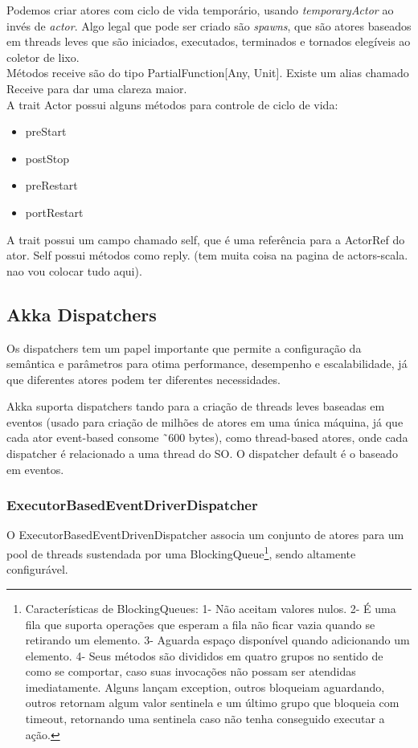 \documentclass[]{article}
\begin{document}
			Podemos criar atores com ciclo de vida temporário, usando \textit{temporaryActor} ao invés de 
			\textit{actor}. Algo legal que pode ser criado são \textit{spawns}, que são atores baseados em threads
			leves que são iniciados, executados, terminados e tornados elegíveis ao coletor de lixo.\\
			
			Métodos receive são do tipo PartialFunction[Any, Unit]. Existe um alias chamado Receive para
			dar uma clareza maior. \\
			
			A trait Actor possui alguns métodos para controle de ciclo de vida:
			\begin{itemize}
				\item preStart
				\item postStop
				\item preRestart
				\item portRestart
			\end{itemize}
			A trait possui um campo chamado self, que é uma referência para a ActorRef do ator. Self possui
			métodos como reply. (tem muita coisa na pagina de actors-scala. nao vou colocar tudo aqui).
			
		\subsection{Akka Dispatchers}
			Os dispatchers tem um papel importante que permite a configuração da semântica e parâmetros para
			otima performance, desempenho e escalabilidade, já que diferentes atores podem ter diferentes
			necessidades.
			
			Akka suporta dispatchers tando para a criação de threads leves baseadas em eventos (usado para
			criação de milhões de atores em uma única máquina, já que cada ator event-based consome ˜600 bytes),
			como thread-based atores, onde cada dispatcher é relacionado a uma thread do SO. O dispatcher default
			é o baseado em eventos.\\
			
			\subsubsection{ExecutorBasedEventDriverDispatcher}
			
			O ExecutorBasedEventDrivenDispatcher associa um conjunto de atores para um pool de threads sustendada
			por uma BlockingQueue\footnote{Características de BlockingQueues: 1- Não aceitam valores nulos. 2- 
			É uma fila que suporta operações que esperam a fila não ficar vazia quando se retirando um elemento.
			3- Aguarda espaço disponível quando adicionando um elemento. 4- Seus métodos são divididos em quatro
			grupos no sentido de como se comportar, caso suas invocações não possam ser atendidas imediatamente.
			Alguns lançam exception, outros bloqueiam aguardando, outros retornam algum valor sentinela e 
			um último grupo que bloqueia com timeout, retornando uma sentinela caso não tenha conseguido
			executar a ação.}, sendo altamente configurável. \\
			
\end{document}
